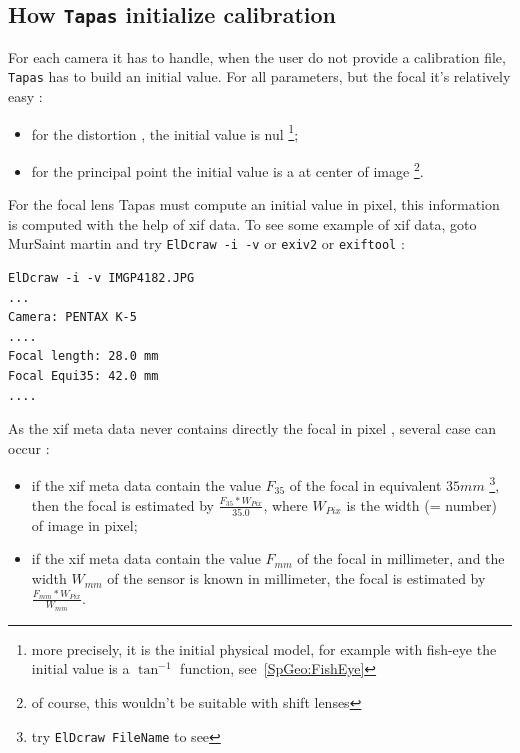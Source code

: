 \subsection{How {\tt Tapas} initialize calibration}

For each camera it has to handle, when the user do not provide a calibration
file, {\tt Tapas} has to build an initial  value. For all parameters, but the
focal it's relatively easy :

\begin{itemize}
  \item for the distortion , the initial value is nul \footnote{more
        precisely, it is the initial physical model, for example 
        with fish-eye the initial value is a $\tan^{-1} $ function, see~\ref{SpGeo:FishEye}};

  \item for the principal point the initial value is a at center of image 
        \footnote{ of course, this wouldn't  be suitable with shift lenses}.
\end{itemize}

For the focal lens Tapas must compute an initial value in pixel, this information is 
computed with the help of xif data. To see some example of xif data, goto MurSaint martin
and try {\tt ElDcraw -i -v} or {\tt exiv2} or {\tt exiftool} :

\begin{verbatim}
ElDcraw -i -v IMGP4182.JPG
...
Camera: PENTAX K-5
....
Focal length: 28.0 mm
Focal Equi35: 42.0 mm
....
\end{verbatim}

As the xif meta data never contains directly the focal in pixel , 
several case can  occur :

\begin{itemize}
  \item if the xif meta data contain the value $F_{35}$ of the focal in equivalent $35mm$  
       \footnote{try {\tt ElDcraw FileName} to see}, then the focal is estimated by
       $\frac{F_{35} * W_{Pix}}{35.0}$, where $W_{Pix}$ is the width (= number) 
       of image in pixel;

  \item if the xif meta data contain the value $F_{mm}$ of the focal in millimeter, 
        and the width  $W_{mm}$  of the sensor is known  in millimeter, the focal is estimated
        by $\frac{F_{mm} * W_{Pix}}{W_{mm}}$.

\end{itemize}

